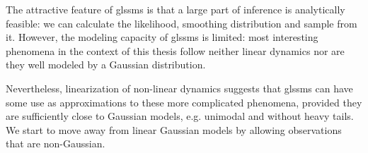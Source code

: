 The attractive feature of \glspl{glssm} is that a large part of inference is analytically feasible: we can calculate the likelihood, smoothing distribution and sample from it. 
However, the modeling capacity of \glspl{glssm} is limited: most interesting phenomena in the context of this thesis follow neither linear dynamics nor are they well modeled by a Gaussian distribution.

Nevertheless, linearization of non-linear dynamics suggests that \gls{glssm}s can have some use as approximations to these more complicated phenomena, provided they are sufficiently close to Gaussian models, e.g. unimodal and without heavy tails.
We start to move away from linear Gaussian models by allowing observations that are non-Gaussian.
